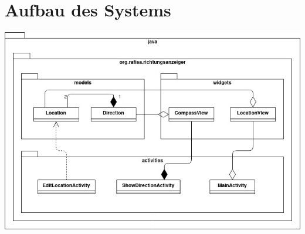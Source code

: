 \documentclass[12pt,a4paper]{scrartcl}
\begin{document}
\section{Aufbau des Systems}


\includegraphics[width=15.0cm]{../system.jpg}

%
%
\end{document}

